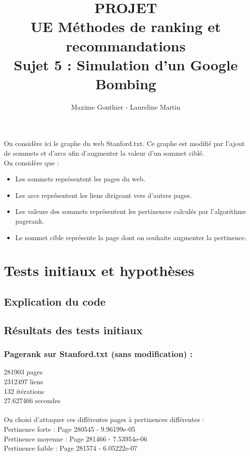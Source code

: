 \documentclass[a4paper,11pt]{article}
\title{PROJET\\ UE Méthodes de ranking et recommandations\\ 
		Sujet 5 : Simulation d'un Google Bombing}
\author{Maxime Gonthier - Laureline Martin}
\begin{document}
\clearpage
	\clearpage
	\maketitle
	\newpage\clearpage{}

\newpage
\tableofcontents
\newpage

On considère ici le graphe du web Stanford.txt. Ce graphe est modifié par l'ajout de sommets et d'arcs afin d'augmenter la valeur d'un sommet ciblé.\\
On considère que :\\
\begin{itemize}
	\item Les sommets représentent les pages du web.
	\item Les arcs représentent les liens dirigeant vers d'autres pages.
	\item Les valeurs des sommets représentent les pertinences calculés par l'algorithme pagerank.
	\item Le sommet cible représente la page dont on souhaite augmenter la pertinence.
\end{itemize}

\section{Tests initiaux et hypothèses}
	\subsection{Explication du code}
	\subsection{Résultats des tests initiaux}
		\subsubsection{Pagerank sur Stanford.txt (sans modification) :}
			281903 pages\\
			2312497 liens\\
			132 itérations\\
			27.627466 secondes\\
			\\
			On choisi d'attaquer ces différentes pages à pertinences différentes :\\
			Pertinence forte : Page 280545 - 9.96199e-05\\
			Pertinence moyenne : Page 281466 - 7.53954e-06\\
			Pertinence faible : Page 281574 - 6.05222e-07\\
			\\
\end{document}
